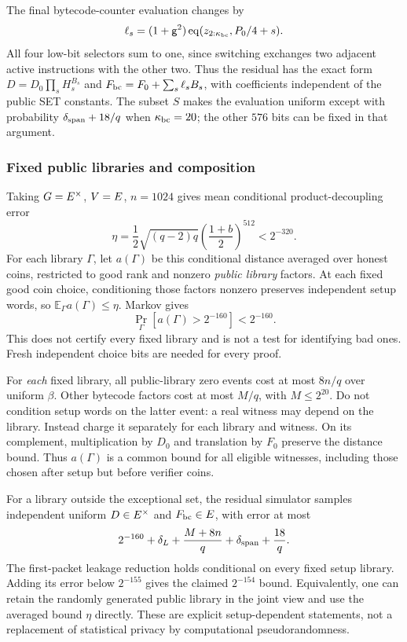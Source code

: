 The final bytecode-counter evaluation changes by
\[
 \ell_s=(1+\mathsf{g}^2)\operatorname{eq}(z_{2:\kappa_{\mathrm{bc}}},P_0/4+s).
\]
All four low-bit selectors sum to one, since switching exchanges two adjacent active instructions with the other two. Thus the residual has the exact form $D=D_0\prod_sH_s^{B_s}$ and $F_{\rm bc}=F_0+\sum_s\ell_sB_s$, with coefficients independent of the public SET constants. The subset $S$ makes the evaluation uniform except with probability $\delta_{\rm span}+18/q$ when $\kappa_{\mathrm{bc}}=20$; the other $576$ bits can be fixed in that argument.

\subsubsection{Fixed public libraries and composition}

Taking $G=E^\times$, $V=E$, $n=1024$ gives mean conditional product-decoupling error
\[
 \eta=\frac12\sqrt{(q-2)q}
       \left(\frac{1+b}{2}\right)^{512}<2^{-320}.
\]
For each library $\Gamma$, let $a(\Gamma)$ be this conditional distance averaged over honest coins, restricted to good rank and nonzero \emph{public library} factors. At each fixed good coin choice, conditioning those factors nonzero preserves independent setup words, so $\mathbb E_\Gamma a(\Gamma)\le\eta$. Markov gives
\[
 \Pr_\Gamma[a(\Gamma)>2^{-160}]<2^{-160}.
\]
This does not certify every fixed library and is not a test for identifying bad ones. Fresh independent choice bits are needed for every proof.

For \emph{each} fixed library, all public-library zero events cost at most $8n/q$ over uniform $\beta$. Other bytecode factors cost at most $M/q$, with $M\le2^{20}$. Do not condition setup words on the latter event: a real witness may depend on the library. Instead charge it separately for each library and witness. On its complement, multiplication by $D_0$ and translation by $F_0$ preserve the distance bound. Thus $a(\Gamma)$ is a common bound for all eligible witnesses, including those chosen after setup but before verifier coins.

For a library outside the exceptional set, the residual simulator samples independent uniform $D\in E^\times$ and $F_{\rm bc}\in E$, with error at most
\[
 2^{-160}+\delta_L+\frac{M+8n}{q}
 +\delta_{\rm span}+\frac{18}{q}.
\]
The first-packet leakage reduction holds conditional on every fixed setup library. Adding its error below $2^{-155}$ gives the claimed $2^{-154}$ bound. Equivalently, one can retain the randomly generated public library in the joint view and use the averaged bound $\eta$ directly. These are explicit setup-dependent statements, not a replacement of statistical privacy by computational pseudorandomness.

